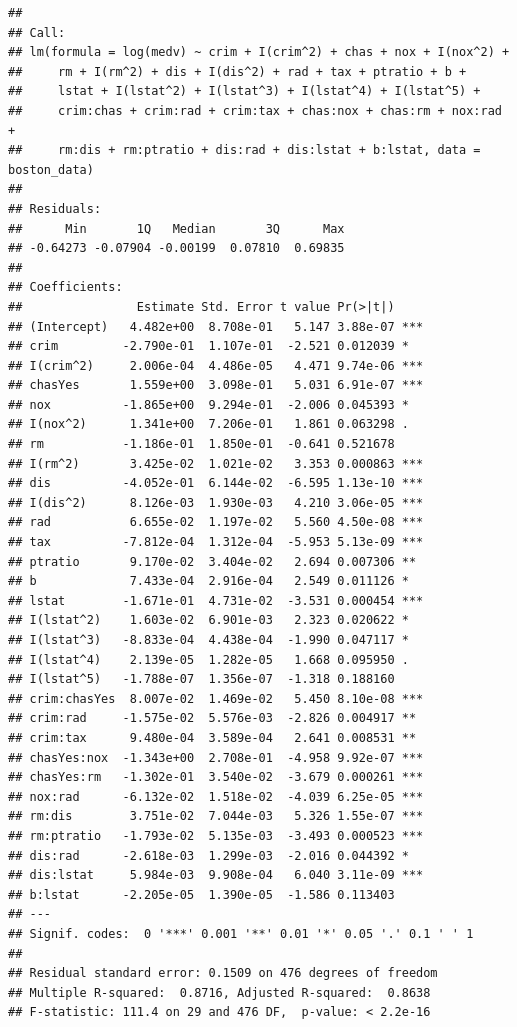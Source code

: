 \documentclass[
]{article}
\begin{document}
\begin{verbatim}
## 
## Call:
## lm(formula = log(medv) ~ crim + I(crim^2) + chas + nox + I(nox^2) + 
##     rm + I(rm^2) + dis + I(dis^2) + rad + tax + ptratio + b + 
##     lstat + I(lstat^2) + I(lstat^3) + I(lstat^4) + I(lstat^5) + 
##     crim:chas + crim:rad + crim:tax + chas:nox + chas:rm + nox:rad + 
##     rm:dis + rm:ptratio + dis:rad + dis:lstat + b:lstat, data = boston_data)
## 
## Residuals:
##      Min       1Q   Median       3Q      Max 
## -0.64273 -0.07904 -0.00199  0.07810  0.69835 
## 
## Coefficients:
##                Estimate Std. Error t value Pr(>|t|)    
## (Intercept)   4.482e+00  8.708e-01   5.147 3.88e-07 ***
## crim         -2.790e-01  1.107e-01  -2.521 0.012039 *  
## I(crim^2)     2.006e-04  4.486e-05   4.471 9.74e-06 ***
## chasYes       1.559e+00  3.098e-01   5.031 6.91e-07 ***
## nox          -1.865e+00  9.294e-01  -2.006 0.045393 *  
## I(nox^2)      1.341e+00  7.206e-01   1.861 0.063298 .  
## rm           -1.186e-01  1.850e-01  -0.641 0.521678    
## I(rm^2)       3.425e-02  1.021e-02   3.353 0.000863 ***
## dis          -4.052e-01  6.144e-02  -6.595 1.13e-10 ***
## I(dis^2)      8.126e-03  1.930e-03   4.210 3.06e-05 ***
## rad           6.655e-02  1.197e-02   5.560 4.50e-08 ***
## tax          -7.812e-04  1.312e-04  -5.953 5.13e-09 ***
## ptratio       9.170e-02  3.404e-02   2.694 0.007306 ** 
## b             7.433e-04  2.916e-04   2.549 0.011126 *  
## lstat        -1.671e-01  4.731e-02  -3.531 0.000454 ***
## I(lstat^2)    1.603e-02  6.901e-03   2.323 0.020622 *  
## I(lstat^3)   -8.833e-04  4.438e-04  -1.990 0.047117 *  
## I(lstat^4)    2.139e-05  1.282e-05   1.668 0.095950 .  
## I(lstat^5)   -1.788e-07  1.356e-07  -1.318 0.188160    
## crim:chasYes  8.007e-02  1.469e-02   5.450 8.10e-08 ***
## crim:rad     -1.575e-02  5.576e-03  -2.826 0.004917 ** 
## crim:tax      9.480e-04  3.589e-04   2.641 0.008531 ** 
## chasYes:nox  -1.343e+00  2.708e-01  -4.958 9.92e-07 ***
## chasYes:rm   -1.302e-01  3.540e-02  -3.679 0.000261 ***
## nox:rad      -6.132e-02  1.518e-02  -4.039 6.25e-05 ***
## rm:dis        3.751e-02  7.044e-03   5.326 1.55e-07 ***
## rm:ptratio   -1.793e-02  5.135e-03  -3.493 0.000523 ***
## dis:rad      -2.618e-03  1.299e-03  -2.016 0.044392 *  
## dis:lstat     5.984e-03  9.908e-04   6.040 3.11e-09 ***
## b:lstat      -2.205e-05  1.390e-05  -1.586 0.113403    
## ---
## Signif. codes:  0 '***' 0.001 '**' 0.01 '*' 0.05 '.' 0.1 ' ' 1
## 
## Residual standard error: 0.1509 on 476 degrees of freedom
## Multiple R-squared:  0.8716, Adjusted R-squared:  0.8638 
## F-statistic: 111.4 on 29 and 476 DF,  p-value: < 2.2e-16
\end{verbatim}
\end{document}
